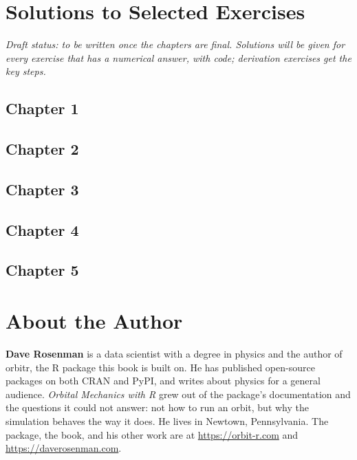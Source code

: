 \documentclass[
  10.5pt,
  letterpaper,
]{scrbook}
\theoremstyle{definition}
\theoremstyle{plain}
\theoremstyle{remark}
\begin{document}
\chapter{Solutions to Selected Exercises}\label{sec-solutions}

\emph{Draft status: to be written once the chapters are final. Solutions
will be given for every exercise that has a numerical answer, with code;
derivation exercises get the key steps.}

\section{Chapter 1}\label{chapter-1}

\section{Chapter 2}\label{chapter-2}

\section{Chapter 3}\label{chapter-3}

\section{Chapter 4}\label{chapter-4}

\section{Chapter 5}\label{chapter-5}

\chapter*{About the Author}\label{about-the-author}


\textbf{Dave Rosenman} is a data scientist with a degree in physics and
the author of orbitr, the R package this book is built on. He has
published open-source packages on both CRAN and PyPI, and writes about
physics for a general audience. \emph{Orbital Mechanics with R} grew out
of the package's documentation and the questions it could not answer:
not how to run an orbit, but why the simulation behaves the way it does.
He lives in Newtown, Pennsylvania. The package, the book, and his other
work are at \url{https://orbit-r.com} and
\url{https://daverosenman.com}.


\backmatter
\end{document}
